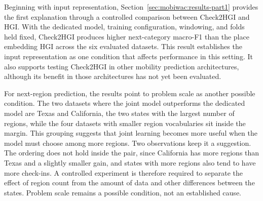 Beginning with input representation, Section~\ref{sec:mobiwac:results-part1} provides the first
explanation through a controlled comparison between Check2HGI and HGI. With the dedicated
model, training configuration, windowing, and folds held fixed, Check2HGI produces higher
next-category macro-F1 than the place embedding HGI across the six evaluated datasets.
This result establishes the input representation as one condition that affects
performance in this setting. It also supports testing Check2HGI in other mobility
prediction architectures, although its benefit in those architectures has not yet been
evaluated.

For next-region prediction, the results point to problem scale as another possible
condition. The two datasets where the joint model outperforms the dedicated model are
Texas and California, the two states with the largest number of regions, while the four
datasets with smaller region vocabularies sit inside the margin. This grouping suggests
that joint learning becomes more useful when the model must choose among more regions.
Two observations keep it a suggestion. The ordering does not hold inside the pair, since
California has more regions than Texas and a slightly smaller gain, and states with more
regions also tend to have more check-ins. A controlled
experiment is therefore required to separate the effect of region count from the amount
of data and other differences between the states. Problem scale remains a possible
condition, not an established cause.



